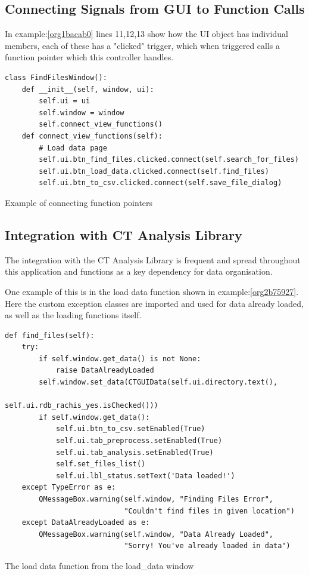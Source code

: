 \documentclass[11pt]{report}
\begin{document}
\subsection{Connecting Signals from GUI to Function Calls}
\label{sec:orgf642656}
In example:\ref{org1bacab0} lines 11,12,13 show how the UI object has individual members, each of these has a "clicked" trigger, which when triggered calls a function pointer which this controller handles.
\begin{listing}[htbp]
\begin{verbatim}
class FindFilesWindow():
    def __init__(self, window, ui):
        self.ui = ui
        self.window = window
        self.connect_view_functions()
    def connect_view_functions(self):
        # Load data page
        self.ui.btn_find_files.clicked.connect(self.search_for_files)
        self.ui.btn_load_data.clicked.connect(self.find_files)
        self.ui.btn_to_csv.clicked.connect(self.save_file_dialog)
\end{verbatim}
\caption{\label{org1bacab0}
Example of connecting function pointers}
\end{listing}

\subsection{Integration with CT Analysis Library}
\label{sec:orgd32c260}

The integration with the CT Analysis Library is frequent and spread throughout this application and functions as a key dependency for data organisation.

One example of this is in the load data function shown in example:\ref{org2b75927}. Here the custom exception classes are imported and used for data already loaded, as well as the loading functions itself.

\begin{listing}[htbp]
\begin{verbatim}
def find_files(self):
    try:
        if self.window.get_data() is not None:
            raise DataAlreadyLoaded
        self.window.set_data(CTGUIData(self.ui.directory.text(),
                                       self.ui.rdb_rachis_yes.isChecked()))
        if self.window.get_data():
            self.ui.btn_to_csv.setEnabled(True)
            self.ui.tab_preprocess.setEnabled(True)
            self.ui.tab_analysis.setEnabled(True)
            self.set_files_list()
            self.ui.lbl_status.setText('Data loaded!')
    except TypeError as e:
        QMessageBox.warning(self.window, "Finding Files Error",
                            "Couldn't find files in given location")
    except DataAlreadyLoaded as e:
        QMessageBox.warning(self.window, "Data Already Loaded",
                            "Sorry! You've already loaded in data")
\end{verbatim}
\caption{\label{org2b75927}
The load data function from the load\_data window}
\end{listing}
\end{document}
